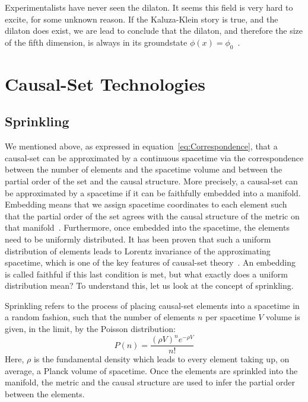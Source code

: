 \documentclass[a4paper,12pt]{article}
\numberwithin{equation}{section}
\begin{document}
Experimentalists have never seen the dilaton. It seems this field is very hard to excite, for some unknown reason. If the Kaluza-Klein story is true, and the dilaton does exist, we are lead to conclude that the dilaton, and therefore the size of the fifth dimension, is always in its groundstate $\phi(x)=\phi_0$~\cite{Zee2013}.


\section{Causal-Set Technologies}
\label{sec:Causal-Set Technologies}
\subsection{Sprinkling}
\label{sec:Sprinkling}

We mentioned above, as expressed in equation~\ref{eq:Correspondence}, that a causal-set can be approximated by a continuous spacetime via the correspondence between the number of elements and the spacetime volume and between the partial order of the set and the causal structure. More precisely, a causal-set can be approximated by a spacetime if it can be faithfully embedded into a manifold. Embedding means that we assign spacetime coordinates to each element such that the partial order of the set agrees with the causal structure of the metric on that manifold~\cite{Bombelli1987}. Furthermore, once embedded into the spacetime, the elements need to be uniformly distributed. It has been proven that such a uniform distribution of elements leads to Lorentz invariance of the approximating spacetime, which is one of the key features of causal-set theory~\cite{Bombelli2006}. An embedding is called faithful if this last condition is met, but what exactly does a uniform distribution mean? To understand this, let us look at the concept of sprinkling.

Sprinkling refers to the process of placing causal-set elements into a spacetime in a random fashion, such that the number of elements $n$ per spacetime $V$ volume is given, in the limit, by the Poisson distribution:
\begin{equation}
\label{eq:Poisson distribution}
P(n)=\frac{(\rho V)^n e^{-\rho V}}{n!}
\end{equation}
Here, $\rho$ is the fundamental density which leads to every element taking up, on average, a Planck volume of spacetime. Once the elements are sprinkled into the manifold, the metric and the causal structure are used to infer the partial order between the elements.
\end{document}
